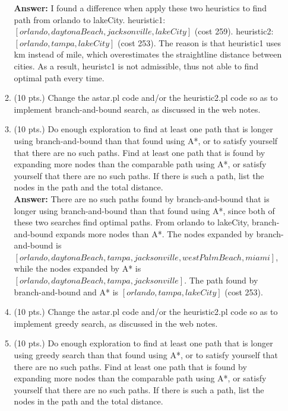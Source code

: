 \documentclass{article}%
\begin{document}
\begin{enumerate}
\begin{enumerate}
  		\textbf{Answer:} I found a difference when apply these two heuristics to find path from orlando to lakeCity. heuristic1: $\left[orlando, daytonaBeach, jacksonville, lakeCity \right]$ (cost 259). heuristic2: $\left[orlando, tampa, lakeCity \right]$ (cost 253). The reason is that heuristic1 uses km instead of mile, which overestimates the straightline distance between cities. As a result, heuristc1 is not admissible, thus not able to find optimal path every time.
  		
  		\item (10 pts.) Change the astar.pl code and/or the heuristic2.pl code so as to implement branch-and-bound search, as discussed in the web notes.
  		\item (10 pts.) Do enough exploration to find at least one path that is longer using branch-and-bound than that found using A*, or to satisfy yourself that there are no such paths. Find at least one path that is found by expanding more nodes than the comparable path using A*, or satisfy yourself that there are no such paths. If there is such a path, list the nodes in the path and the total distance.\\
  		
  		\textbf{Answer:} There are no such paths found by branch-and-bound that is longer using branch-and-bound than that found using A*, since both of these two searches find optimal paths. From orlando to lakeCity, branch-and-bound expands more nodes than A*. The nodes expanded by branch-and-bound is \\ $\left[orlando, daytonaBeach, tampa, jacksonville, westPalmBeach,miami \right]$, while the nodes expanded by A* is $\left[orlando, daytonaBeach, tampa, jacksonville \right]$. The path found by branch-and-bound and A* is $\left[orlando, tampa, lakeCity \right]$ (cost 253).
  		
  		
  		\item (10 pts.) Change the astar.pl code and/or the heuristic2.pl code so as to implement greedy search, as discussed in the web notes.
  		\item (10 pts.) Do enough exploration to find at least one path that is longer using greedy search than that found using A*, or to satisfy yourself that there are no such paths. Find at least one path that is found by expanding more nodes than the comparable path using A*, or satisfy yourself that there are no such paths. If there is such a path, list the nodes in the path and the total distance.\\
  		

\end{enumerate}
\end{enumerate}
\end{document}
